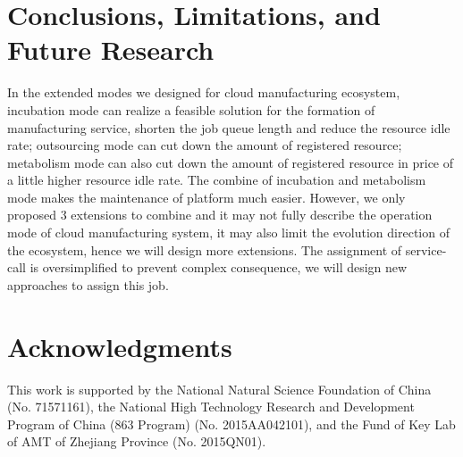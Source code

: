 \section{Conclusions, Limitations, and Future Research} %
\label{sec:contributions_limitations_and_future_research}
In the extended modes we designed for cloud manufacturing ecosystem, incubation mode can realize a feasible solution for the formation of manufacturing service, shorten the job queue length and reduce the resource idle rate; outsourcing mode can cut down the amount of registered resource; metabolism mode can also cut down the amount of registered resource in price of a little higher resource idle rate. The combine of incubation and metabolism mode makes the maintenance of platform much easier.
However, we only proposed 3 extensions to combine and it may not fully describe the operation mode of cloud manufacturing system, it may also limit the evolution direction of the ecosystem, hence we will design more extensions. The assignment of service-call is oversimplified to prevent complex consequence, we will design new approaches to assign this job.

\section{Acknowledgments} %
\label{sec:acknowledgments}
This work is supported by the National Natural Science Foundation of China (No. 71571161), the National High Technology Research and Development Program of China (863 Program) (No. 2015AA042101), and the Fund of Key Lab of AMT of Zhejiang Province (No. 2015QN01). 
